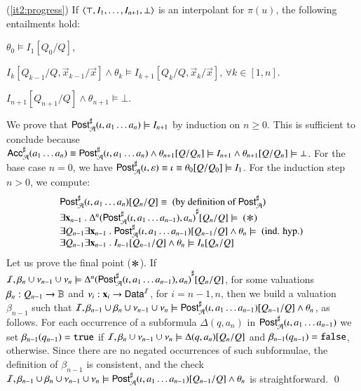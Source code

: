 \documentclass[10pt,conference,letterpaper,twocolumn]{IEEEtran}
\begin{document}
{  (\ref{it2:progress}) If $\left\langle \top,I_1,\dots,I_{n+1},\bot \right\rangle$ is an
    interpolant for $\pi(u)$, the following entailments hold: \begin{compactitem}
    \item $\theta_0 \models I_1[Q_0/Q]$, 
    \item $I_k[Q_{k-1}/Q,\vec{x}_{k-1}/\vec{x}] \wedge \theta_k \models I_{k+1}[Q_k/Q,\vec{x}_k/\vec{x}]$, $\forall k\in[1,n]$. 
    \item $I_{n+1}[Q_{n+1}/Q] \wedge \theta_{n+1} \models \bot$. 
    \end{compactitem}
    We prove that ${\mathsf{Post}}^\sharp_{\mathcal{A}}(\iota,a_1\ldots a_n) \models I_{n+1}$
    by induction on $n \geq 0$. This is sufficient to conclude because
    ${\mathsf{Acc}}^\sharp_{\mathcal{A}}(a_1\ldots a_n) \equiv {\mathsf{Post}}^\sharp_{\mathcal{A}}(\iota,a_1\ldots
    a_n) \wedge \theta_{n+1}[Q/Q_n] \models I_{n+1} \wedge
    \theta_{n+1}[Q/Q_n] \models \bot$. For the base case $n=0$, we
    have ${\mathsf{Post}}^\sharp_{\mathcal{A}}(\iota,\varepsilon) \equiv \iota \equiv
    \theta_0[Q/Q_0] \models I_1$. For the induction step $n>0$, we
    compute:
    \[\begin{array}{l}
    \AbsPost{\A}(\iota,a_1\ldots a_n)[Q_n/Q] \equiv \text{ (by definition of $\AbsPost{\A}$)} \\
    \exists \vec{x}_{n-1} ~.~ \abs{\Delta^n(\AbsPost{\A}(\iota,a_1\ldots a_{n-1}),a_n)}[Q_n/Q] \models \text{ ($\Asterisk$)} \\
    \exists Q_{n-1}  \exists \vec{x}_{n-1} ~.~ \AbsPost{\A}(\iota,a_1\ldots a_{n-1})[Q_{n-1}/Q] \wedge \theta_n \models \text{ (ind. hyp.) } \\
    \exists Q_{n-1}  \exists \vec{x}_{n-1} ~.~ I_{n-1}[Q_{n-1}/Q] \wedge \theta_n \models I_n[Q_n/Q] 
    \end{array}\]
   Let us prove the final point ($\Asterisk$). If
   $\mathcal{I},\beta_n\cup\nu_{n-1}\cup\nu_n \models
   {\Delta^n({\mathsf{Post}}^\sharp_{\mathcal{A}}(\iota,a_1\ldots a_{n-1}),a_n)}^\sharp[Q_{n}/Q]$,
   for some valuations $\beta_{n} : Q_{n-1} \rightarrow \mathbb{B}$ and
   $\nu_i : \mathbf x_i \rightarrow \mathsf{Data}^{\mathcal{I}}$, for $i=n-1,n$, then we
   build a valuation $\beta_{n-1}$ such that
   $\mathcal{I},\beta_{n-1}\cup\beta_n \cup \nu_{n-1}\cup\nu_n \models
   {\mathsf{Post}}^\sharp_{\mathcal{A}}(\iota,a_1\ldots a_{n-1})[Q_{n-1}/Q] \wedge \theta_n$,
   as follows. For each occurrence of a subformula $\Delta(q,a_n)$ in
   ${\mathsf{Post}}^\sharp_{\mathcal{A}}(\iota,a_1\ldots a_{n-1})$ we set
   $\beta_{n-1}(q_{n-1}) = \mathtt{true}$ if $\mathcal{I},\beta_n\cup\nu_{n-1}\cup\nu_n
   \models \Delta(q,a_n)[Q_n/Q]$ and $\beta_{n-1}(q_{n-1}) = \mathtt{false}$,
   otherwise. Since there are no negated occurrences of such
   subformulae, the definition of $\beta_{n-1}$ is consistent, and the
   check $\mathcal{I},\beta_{n-1}\cup\beta_n \cup \nu_{n-1}\cup\nu_n \models
   {\mathsf{Post}}^\sharp_{\mathcal{A}}(\iota,a_1\ldots a_{n-1})[Q_{n-1}/Q] \wedge \theta_n$
   is straightforward. \qed}
\end{document}
